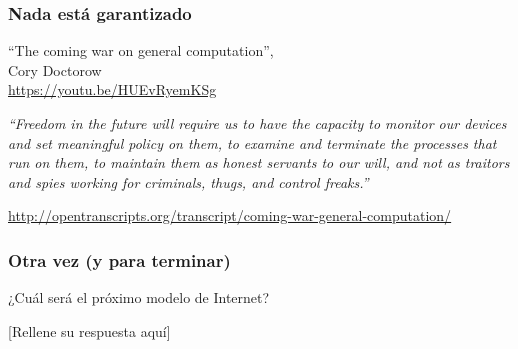 \documentclass[17pt,aspectratio=169,hyperref=pdfusetitle]{beamer}
\begin{document}
\begin{frame}[fragile]
  \frametitle{Nada está garantizado}

  ``The coming war on general computation'', \\
  Cory Doctorow \\

  \url{https://youtu.be/HUEvRyemKSg}
\end{frame}

\begin{frame}[fragile]

  {\em
  ``Freedom in the future will require us to have the capac­i­ty to mon­i­tor our devices and set mean­ing­ful pol­i­cy on them, to exam­ine and ter­mi­nate the process­es that run on them, to main­tain them as hon­est ser­vants to our will, and not as trai­tors and spies work­ing for crim­i­nals, thugs, and con­trol freaks.''
  }

  \begin{flushright}
  {\small
    \url{http://opentranscripts.org/transcript/coming-war-general-computation/}
  }
  \end{flushright}
  
\end{frame}

\begin{frame}[fragile]
  \frametitle{Otra vez (y para terminar)}


  ¿Cuál será el próximo modelo de Internet?

  \vspace{2cm}
  
  [Rellene su respuesta aquí]
  
\end{frame}
\end{document}
